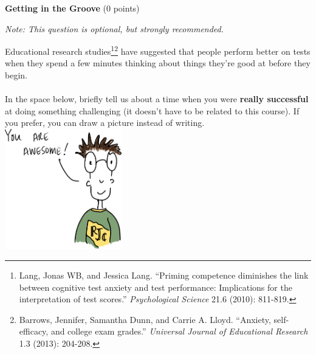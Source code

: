 \documentclass[12pt]{article}
\newenvironment{question}[2][Question]{\begin{trivlist}
\item[\hskip \labelsep {\bfseries #1}\hskip \labelsep {\bfseries #2.}]}{\end{trivlist}}
\begin{document}
\clearpage
\begin{question}{0}\textbf{Getting in the Groove} (0 points)
\begin{center}
\textit{Note: This question is optional, but strongly recommended.}
\end{center}
Educational research studies\footnote{\scriptsize{Lang, Jonas WB, and Jessica Lang. ``Priming competence diminishes the link between cognitive test anxiety and test performance: Implications for the interpretation of test scores.'' \textit{Psychological Science} 21.6 (2010): 811-819.}}\footnote{\scriptsize{Barrows, Jennifer, Samantha Dunn, and Carrie A. Lloyd. ``Anxiety, self-efficacy, and college exam grades.'' \textit{Universal Journal of Educational Research} 1.3 (2013): 204-208.}} have suggested that people perform better on tests when they spend a few minutes thinking about things they're good at before they begin.\\\\
In the space below, briefly tell us about a time when you were \textbf{really successful} at doing something challenging (it doesn't have to be related to this course). If you prefer, you can draw a picture instead of writing.\\
\vfill
\hfill
\includegraphics[width=2in]{youcandoit.png}
\end{question}
\end{document}
